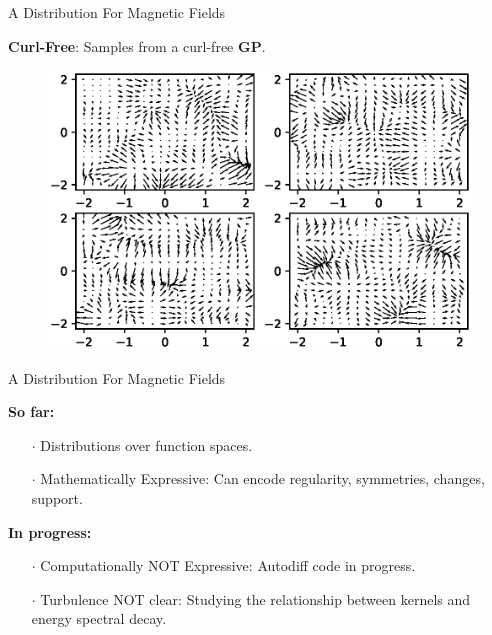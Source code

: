 \documentclass{beamer}
\begin{document}
\begin{frame}{A Distribution For Magnetic Fields}

  \textbf{Curl-Free}: Samples from a curl-free \textbf{GP}.

  \begin{figure}
    \includegraphics[width=\linewidth]{plots/curl_free.eps}
  \end{figure}

\end{frame}

\begin{frame}{A Distribution For Magnetic Fields}

  \textbf{So far:}
  \begin{itemize}
    \item[$\cdot$] Distributions over function spaces.
    \item[$\cdot$] Mathematically Expressive: Can encode regularity, symmetries, changes, support.
  \end{itemize}

  \textbf{In progress:}
  \begin{itemize}
    \item[$\cdot$] Computationally NOT Expressive: Autodiff code in progress.
    \item[$\cdot$] Turbulence NOT clear: Studying the relationship between kernels and energy spectral decay.
  \end{itemize}

\end{frame}
\end{document}
